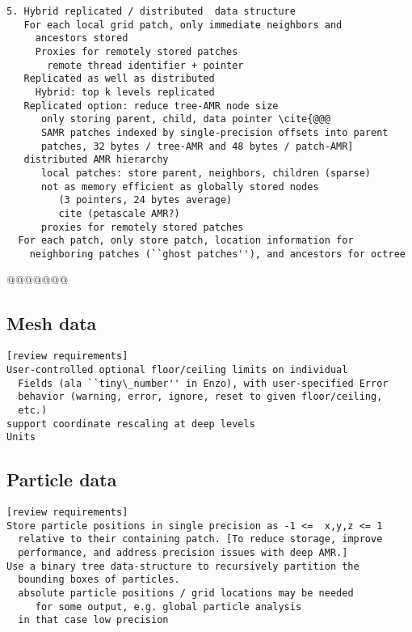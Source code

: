 \documentclass[10pt]{article}
\begin{document}
\begin{verbatim}
5. Hybrid replicated / distributed  data structure
   For each local grid patch, only immediate neighbors and
     ancestors stored
     Proxies for remotely stored patches
       remote thread identifier + pointer
   Replicated as well as distributed
     Hybrid: top k levels replicated
   Replicated option: reduce tree-AMR node size
      only storing parent, child, data pointer \cite{@@@
      SAMR patches indexed by single-precision offsets into parent
      patches, 32 bytes / tree-AMR and 48 bytes / patch-AMR]
   distributed AMR hierarchy
      local patches: store parent, neighbors, children (sparse)
      not as memory efficient as globally stored nodes 
         (3 pointers, 24 bytes average)
         cite (petascale AMR?)
      proxies for remotely stored patches
  For each patch, only store patch, location information for
    neighboring patches (``ghost patches''), and ancestors for octree
\end{verbatim}

@@@@@@@


\subsection{Mesh data} \label{ss:design-fields}

\begin{verbatim}
[review requirements]
User-controlled optional floor/ceiling limits on individual
  Fields (ala ``tiny\_number'' in Enzo), with user-specified Error
  behavior (warning, error, ignore, reset to given floor/ceiling,
  etc.)
support coordinate rescaling at deep levels
Units
\end{verbatim}

\subsection{Particle data} \label{ss:design-particles}

\begin{verbatim}
[review requirements]
Store particle positions in single precision as -1 <=  x,y,z <= 1
  relative to their containing patch. [To reduce storage, improve
  performance, and address precision issues with deep AMR.]
Use a binary tree data-structure to recursively partition the
  bounding boxes of particles.
  absolute particle positions / grid locations may be needed
     for some output, e.g. global particle analysis
  in that case low precision
\end{verbatim}
\end{document}
